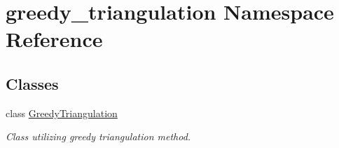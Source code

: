 \hypertarget{namespacegreedy__triangulation}{}\section{greedy\+\_\+triangulation Namespace Reference}
\label{namespacegreedy__triangulation}
\subsection*{Classes}
\begin{DoxyCompactItemize}
\item 
class \hyperlink{classgreedy__triangulation_1_1_greedy_triangulation}{Greedy\+Triangulation}
\begin{DoxyCompactList}\small\item\em Class utilizing greedy triangulation method. \end{DoxyCompactList}\end{DoxyCompactItemize}
